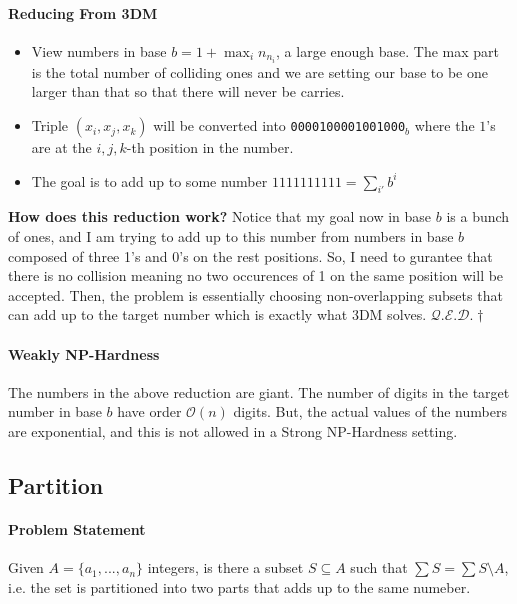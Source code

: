 \documentclass[10pt]{article}
\newcommand{\qed}{\hfill $\mathcal{Q}.\mathcal{E}.\mathcal{D}.\dagger$}
\begin{document}
\paragraph{Reducing From 3DM}
\begin{itemize}
    \item View numbers in base $b = 1 + \max_i n_{n_i}$, a large enough base. The max part is the total number of colliding ones and we are setting our base to be one larger than that so that there will never be carries. 
    \item Triple $(x_i, x_j, x_k)$ will be converted into \texttt{0000100001001000$_b$} where the $1$'s are at the $i,j,k$-th position in the number.
    \item The goal is to add up to some number $1111111111 = \sum_{i'} b^{i}$
\end{itemize}
\textbf{How does this reduction work?} Notice that my goal now in base $b$ is a bunch of ones, and I am trying to add up to this number from numbers in base $b$ composed of three 1's and 0's on the rest positions. So, I need to gurantee that there is no collision meaning no two occurences of 1 on the same position will be accepted. Then, the problem is essentially choosing non-overlapping subsets that can add up to the target number which is exactly what 3DM solves. \qed

\paragraph{Weakly NP-Hardness} The numbers in the above reduction are giant. The number of digits in the target number in base $b$ have order $\mathcal{O}(n)$ digits. But, the actual values of the numbers are exponential, and this is not allowed in a Strong NP-Hardness setting. 

\subsection{Partition}
\paragraph{Problem Statement} Given $A = \{a_1,...,a_n\}$ integers, is there a subset $S\subseteq A$ such that  $\sum S = \sum S\setminus A$, i.e. the set is partitioned into two parts that adds up to the same numeber.
\end{document}
